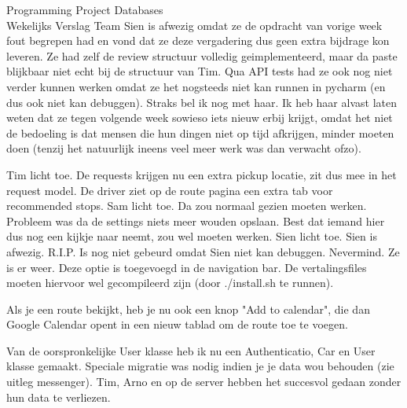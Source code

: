 \documentclass{article}
\newcounter{team}
\begin{document}
\begin{Minutes}{Programming Project Databases \\ Wekelijks Verslag Team }
            Sien is afwezig omdat ze de opdracht van vorige week fout begrepen had en vond dat ze deze vergadering dus geen extra bijdrage kon leveren. Ze had zelf de review structuur volledig geimplementeerd, maar da paste blijkbaar niet echt bij de structuur van Tim. Qua API tests had ze ook nog niet verder kunnen werken omdat ze het nogsteeds niet kan runnen in pycharm (en dus ook niet kan debuggen). Straks bel ik nog met haar. Ik heb haar alvast laten weten dat ze tegen volgende week sowieso iets nieuw erbij krijgt, omdat het niet de bedoeling is dat mensen die hun dingen niet op tijd afkrijgen, minder moeten doen (tenzij het natuurlijk ineens veel meer werk was dan verwacht ofzo).



		            Tim licht toe. De requests krijgen nu een extra pickup locatie, zit dus mee in het request model. De driver ziet op de route pagina een extra tab voor recommended stops.
		            Sam licht toe. Da zou normaal gezien moeten werken. Probleem was da de settings niets meer wouden opslaan. Best dat iemand hier dus nog een kijkje naar neemt, zou wel moeten werken.
		            Sien licht toe. Sien is afwezig. R.I.P. Is nog niet gebeurd omdat Sien niet kan debuggen. Nevermind. Ze is er weer.
		            Deze optie is toegevoegd in de navigation bar. De vertalingsfiles moeten hiervoor wel gecompileerd zijn (door ./install.sh te runnen).

		            Als je een route bekijkt, heb je nu ook een knop "Add to calendar", die dan Google Calendar opent in een nieuw tablad om de route toe te voegen.

		            Van de oorspronkelijke User klasse heb ik nu een Authenticatio, Car en User klasse gemaakt. Speciale migratie was nodig indien je je data wou behouden (zie uitleg messenger). Tim, Arno en op de server hebben het succesvol gedaan zonder hun data te verliezen.


\end{Minutes}
\end{document}
